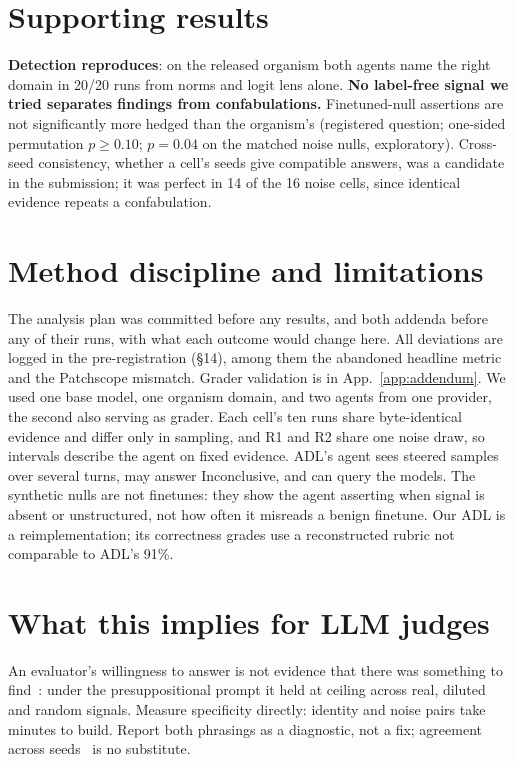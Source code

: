\documentclass{article}
\begin{document}
\section{Supporting results}
\label{sec:support}

\textbf{Detection reproduces}: on the released organism both agents name the
right domain in 20/20 runs from norms and logit lens alone. \textbf{No label-free
signal we tried separates findings from confabulations.} Finetuned-null
assertions are not significantly more hedged than the organism's (registered
question; one-sided permutation $p\geq0.10$; $p=0.04$ on the matched noise nulls,
exploratory). Cross-seed consistency, whether a cell's seeds give compatible
answers, was a candidate in the submission; it was perfect in 14 of the 16 noise
cells, since identical evidence repeats a confabulation.

\section{Method discipline and limitations}

The analysis plan was committed before any results, and both addenda before any
of their runs, with what each outcome would change here. All deviations are
logged in the pre-registration (\S14), among them the abandoned headline metric
and the Patchscope mismatch. Grader validation is in App.~\ref{app:addendum}. We
used one base model, one organism domain, and two agents from one provider, the
second also serving as grader. Each cell's ten runs share byte-identical evidence
and differ only in sampling, and R1 and R2 share one noise draw, so intervals
describe the agent on fixed evidence. ADL's agent sees steered samples over
several turns, may answer Inconclusive, and can query the models. The synthetic
nulls are not finetunes: they show the agent asserting when signal is absent or
unstructured, not how often it misreads a benign finetune. Our ADL is a
reimplementation; its correctness grades use a reconstructed rubric not
comparable to ADL's 91\%.

\section{What this implies for LLM judges}

An evaluator's willingness to answer is not evidence that there was something to
find~\cite{tian25overconf}: under the presuppositional prompt it held at ceiling
across real, diluted and random signals. Measure specificity directly: identity
and noise pairs take minutes to build. Report both phrasings as a diagnostic, not
a fix; agreement across seeds~\cite{schroeder24rely} is no substitute.
\end{document}
